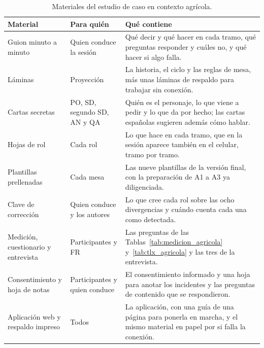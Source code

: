 \documentclass[12pt,letterpaper,oneside]{report}
\begin{document}
\begin{table}[H]
\caption{Materiales del estudio de caso en contexto agrícola.}
\label{tab:materiales_agricola}
\centering
\footnotesize
\renewcommand{\arraystretch}{1.12}
\begin{tabularx}{\textwidth}{@{}L{3.3cm} L{3.0cm} Y@{}}
\toprule
\textbf{Material} & \textbf{Para quién} & \textbf{Qué contiene} \\
\midrule
Guion minuto a minuto & Quien conduce la sesión & Qué decir y qué hacer en cada
tramo, qué preguntas responder y cuáles no, y qué hacer si algo falla. \\
Láminas & Proyección & La historia, el ciclo y las reglas de mesa, más unas
láminas de respaldo para trabajar sin conexión. \\
Cartas secretas & PO, SD, segundo SD, AN y QA & Quién es el personaje, lo que
viene a pedir y lo que da por hecho; las cartas españolas sugieren además cómo
hablar. \\
Hojas de rol & Cada rol & Lo que hace en cada tramo, que en la sesión aparece
también en el celular, tramo por tramo. \\
Plantillas prellenadas & Cada mesa & Las nueve plantillas de la versión final,
con la preparación de A1 a A3 ya diligenciada. \\
Clave de corrección & Quien conduce y los autores & Lo que cree cada rol sobre
las ocho divergencias y cuándo cuenta cada una como detectada. \\
Medición, cuestionario y entrevista & Participantes y FR & Las preguntas de las
Tablas~\ref{tab:medicion_agricola} y~\ref{tab:tlx_agricola} y las tres de la
entrevista. \\
Consentimiento y hoja de notas & Participantes y quien conduce & El
consentimiento informado y una hoja para anotar los incidentes y las preguntas
de contenido que se respondieron. \\
Aplicación web y respaldo impreso & Todos & La aplicación, con una guía de una
página para ponerla en marcha, y el mismo material en papel por si falla la
conexión. \\
\bottomrule
\end{tabularx}
\end{table}
\end{document}
